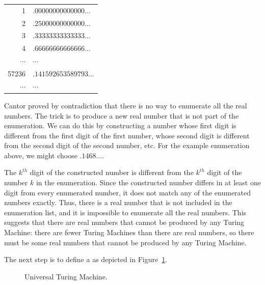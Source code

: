 \begin{tabular}[c]{rl}
1     & $.00000000000000\ldots$ \\
2     & $.25000000000000\ldots$ \\
3     & $.33333333333333\ldots$ \\
4     & $.66666666666666\ldots$ \\
$\cdots$ & $\cdots$ \\
57236 & $.141592653589793\ldots$\\
$\cdots$ & $\cdots$ \\
\end{tabular}

Cantor proved by contradiction that there is no way to enumerate all the real numbers.  The trick is to produce a new real number that is not part of the enumeration.  We can do this by constructing a number whose first digit is different from the first digit of the first number, whose second digit is different from the second digit of the second number, etc.  For the example enumeration above, we might choose $.1468\ldots$.  

The $k^{th}$ digit of the constructed number is different from the $k^{th}$ digit of the number $k$ in the enumeration.  Since the constructed number differs in at least one digit from every enumerated number, it does not match any of the enumerated numbers exactly.  Thus, there is a real number that is not included in the enumeration list, and it is impossible to enumerate all the real numbers.  This suggests that there are real numbers that cannot be produced by any Turing Machine: there are fewer Turing Machines than there are real numbers, so there must be some real numbers that cannot be produced by any Turing Machine.

The next step is to define a  as depicted in Figure~\ref{fig:universalmachine}.

\begin{figure}[bthp]
\begin{center}
{}
\caption{Universal Turing Machine.}\label{fig:universalmachine}
\end{center}
\end{figure}


